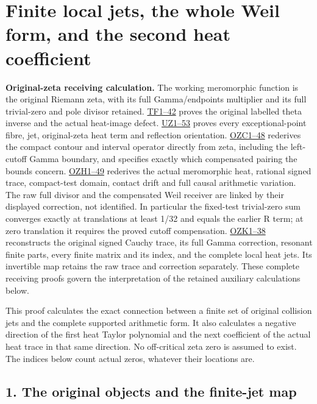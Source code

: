 \documentclass[
  10pt,
  a4paper,
]{article}
\author{}
\date{}
\begin{document}
{
\setcounter{tocdepth}{3}
\tableofcontents
}
\section{Finite local jets, the whole Weil form, and the second heat
coefficient}\label{finite-local-jets-the-whole-weil-form-and-the-second-heat-coefficient}

\textbf{Original-zeta receiving calculation.} The working meromorphic
function is the original Riemann zeta, with its full Gamma/endpoints
multiplier and its full trivial-zero and pole divisor retained.
\href{FAITHFUL_THETA_COMPLETION_RETURN.md}{TF1--42} proves the original
labelled theta inverse and the actual heat-image defect.
\href{FAITHFUL_UNCOMPLETED_ZETA_HEAT.md}{UZ1--53} proves every
exceptional-point fibre, jet, original-zeta heat term and reflection
orientation.
\href{ORIGINAL_ZETA_COMPACT_WEIL_RECONSTRUCTION.md}{OZC1--48} rederives
the compact contour and interval operator directly from zeta, including
the left-cutoff Gamma boundary, and specifies exactly which compensated
pairing the bounds concern.
\href{ORIGINAL_ZETA_HEAT_CONTACT_RECONSTRUCTION.md}{OZH1--49} rederives
the actual meromorphic heat, rational signed trace, compact-test domain,
contact drift and full causal arithmetic variation. The raw full divisor
and the compensated Weil receiver are linked by their displayed
correction, not identified. In particular the fixed-test trivial-zero
sum converges exactly at translations at least 1/32 and equals the
earlier R term; at zero translation it requires the proved cutoff
compensation. \href{ORIGINAL_ZETA_CAUCHY_RECONSTRUCTION.md}{OZK1--38}
reconstructs the original signed Cauchy trace, its full Gamma
correction, resonant finite parts, every finite matrix and its index,
and the complete local heat jets. Its invertible map retains the raw
trace and correction separately. These complete receiving proofs govern
the interpretation of the retained auxiliary calculations below.

This proof calculates the exact connection between a finite set of
original collision jets and the complete supported arithmetic form. It
also calculates a negative direction of the first heat Taylor polynomial
and the next coefficient of the actual heat trace in that same
direction. No off-critical zeta zero is assumed to exist. The indices
below count actual zeros, whatever their locations are.

\subsection{1. The original objects and the finite-jet
map}\label{the-original-objects-and-the-finite-jet-map}
\end{document}
